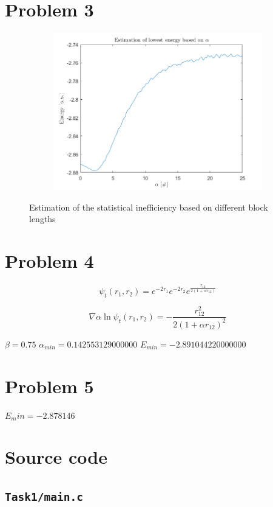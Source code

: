 \section*{Problem 3}


\begin{figure}[H]
	\centering
	\captionsetup[subfigure]{justification=centering}
	\begin{subfigure}[b]{0.4\textwidth}
		\centering
		\includegraphics[width=\textwidth]{graphics/task3/lowest_energy.png}
	\end{subfigure}
	\caption{Estimation of the statistical inefficiency based on different block lengths}
	\label{fig:optimize_alpha}
\end{figure}



\section*{Problem 4}

\begin{equation}
	\psi_t(r_1,r_2) = e^{-2r_1}e^{-2r_2}e^{\frac{r_{12}}{2(1+\alpha r_{12})}}
\end{equation}

\begin{equation}
	\nabla \alpha \ln{\psi_t(r_1,r_2)} = -\frac{r_{12}^2}{2(1+\alpha r_{12})^2}
\end{equation}

$\beta = 0.75$
$\alpha_{min}=0.142553129000000$
$E_{min}=-2.891044220000000$

\section*{Problem 5}

$E_min=-2.878146$





\appendix
\section{Source code}

\subsection{\texttt{Task1/main.c}}
%


